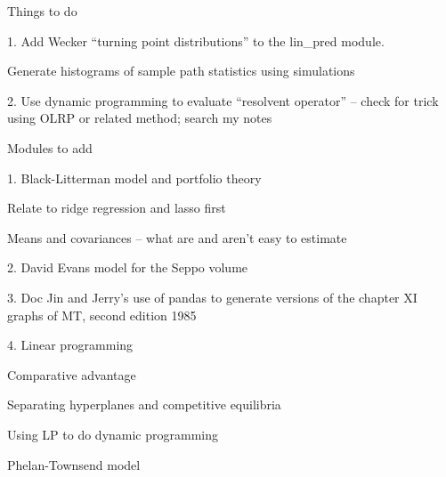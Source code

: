 
Things to do

  1. Add Wecker ``turning point distributions'' to the lin_pred module.
  
      Generate histograms of sample path statistics using simulations
  
  2. Use dynamic programming to evaluate ``resolvent operator''  -- check for trick using OLRP or related method;  search my notes

Modules to add

  1. Black-Litterman model and portfolio theory 
   
     Relate to ridge regression and lasso first
     
     Means and covariances -- what are and aren't easy to estimate
     
  2. David Evans model for the Seppo volume
  
  3. Doc Jin and Jerry's use of pandas to generate versions of the chapter XI graphs of MT, second edition 1985
  
  4. Linear programming 
  
     Comparative advantage
     
     Separating hyperplanes and competitive equilibria
     
     Using LP to do dynamic programming 
     
        Phelan-Townsend model
        
   
